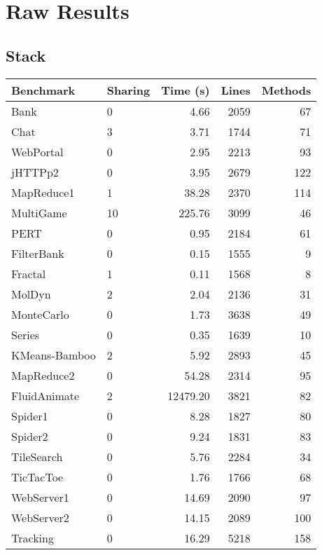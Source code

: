 \documentclass{amsart}[9pt]
\begin{document}
\section{Raw Results}

\subsection{Stack}

\begin{tabular}{|l|l|r|r|r|}
\hline
Benchmark & Sharing & Time (s) & Lines & Methods \\
\hline
Bank          & 0  & 4.66     & 2059 & 67 \\
Chat          & 3  & 3.71     & 1744 & 71 \\
WebPortal     & 0  & 2.95     & 2213 & 93 \\
jHTTPp2       & 0  & 3.95     & 2679 & 122 \\
MapReduce1    & 1  & 38.28    & 2370 & 114 \\
MultiGame     & 10 & 225.76   & 3099 & 46 \\
PERT          & 0  & 0.95     & 2184 & 61 \\
FilterBank    & 0  & 0.15     & 1555 & 9 \\
Fractal       & 1  & 0.11     & 1568 & 8 \\
MolDyn        & 2  & 2.04     & 2136 & 31 \\
MonteCarlo    & 0  & 1.73     & 3638 & 49 \\
Series        & 0  & 0.35     & 1639 & 10 \\
KMeans-Bamboo & 2  & 5.92     & 2893 & 45 \\
MapReduce2    & 0  & 54.28    & 2314 & 95 \\
FluidAnimate  & 2  & 12479.20 & 3821 & 82 \\
Spider1       & 0  & 8.28     & 1827 & 80 \\
Spider2       & 0  & 9.24     & 1831 & 83 \\
TileSearch    & 0  & 5.76     & 2284 & 34 \\
TicTacToe     & 0  & 1.76     & 1766 & 68 \\
WebServer1    & 0  & 14.69    & 2090 & 97 \\
WebServer2    & 0  & 14.15    & 2089 & 100 \\
Tracking      & 0  & 16.29    & 5218 & 158 \\
\hline
\end{tabular}
\end{document}
